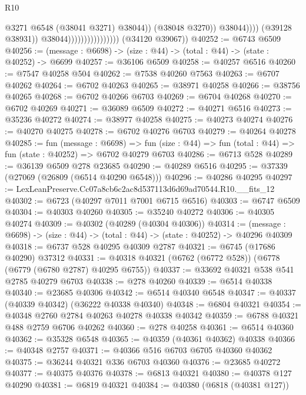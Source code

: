 \begin{lexlean}{R10}
\begin{coremodule}
                                                      @3271
                                                      @6548
                                                      (@38041 @3271)
                                                      @38044))
                                                  (@38048 @3270))
                                                @38044))))
                                        (@39128 @38931))
                                      @38044))))))))))))))))
      (@34120 @39067))
@40252 := @6743 @6509
@40256 := (message : @6698) -> (size : @44) -> (total : @44) -> (state : @40252) -> @6699
@40257 := @36106 @6509
@40258 := @40257 @6516
@40260 := @7547 @40258 @504
@40262 := @7538 @40260 @7563
@40263 := @6707 @40262
@40264 := @6702 @40263
@40265 := @38971 @40258
@40266 := @38756 @40265
@40268 := @6702 @40266 @6703
@40269 := @6704 @40268
@40270 := @6702 @40269
@40271 := @36089 @6509
@40272 := @40271 @6516
@40273 := @35236 @40272
@40274 := @38977 @40258
@40275 := @40273 @40274
@40276 := @40270 @40275
@40278 := @6702 @40276 @6703
@40279 := @40264 @40278
@40285 := fun (message : @6698) =>
  fun (size : @44) => fun (total : @44) => fun (state : @40252) => @6702 @40279 @6703
@40286 := @6713 @528
@40289 := @36139 @6509 @278 @23685
@40290 := @40289 @6516
@40295 := @37339 (@27069 (@26809 (@6514 @40290 @6548)))
@40296 := @40286 @40295
@40297 := LexLeanPreserve.Cc07a8cb6c2ac8d537113d6d69ad70544.R10.__fits_12
@40302 := @6723 (@40297 @7011 @7001 @6715 @6516)
@40303 := @6747 @6509
@40304 := @40303 @40260
@40305 := @35240 @40272
@40306 := @40305 @40274
@40309 := @40302 (@40289 (@40304 @40306))
@40314 := (message : @6698) -> (size : @44) -> (total : @44) -> (state : @40252) -> @40296 @40309
@40318 := @6737 @528 @40295 @40309 @2787
@40321 := @6745 (@17686 @40290) @37312
@40331 := @40318 @40321 (@6762 (@6772 @528)) (@6778 (@6779 (@6780 @2787) @40295 @6755))
@40337 := @33692 @40321 @538 @541 @2785 @40279 @6703
@40338 := @278 @40260
@40339 := @6514 @40338
@40340 := @23685 @40306
@40342 := @6514 @40340 @6548
@40347 := @40337 (@40339 @40342) (@36222 @40338 @40340)
@40348 := @6804 @40321
@40354 := @40348 @2760 @2784 @40263 @40278 @40338 @40342
@40359 := @6788 @40321 @488 @2759 @6706 @40262
@40360 := @278 @40258
@40361 := @6514 @40360
@40362 := @35328 @6548
@40365 := @40359 (@40361 @40362) @40338
@40366 := @40348 @2757
@40371 := @40366 @516 @6703 @6705 @40360 @40362
@40375 := @36244 @40321 @336 @6703 @40360
@40376 := @23685 @40272
@40377 := @40375 @40376
@40378 := @6813 @40321
@40380 := @40378 @127 @40290
@40381 := @6819 @40321
@40384 := @40380 (@6818 (@40381 @127))

\end{coremodule}
\end{lexlean}
